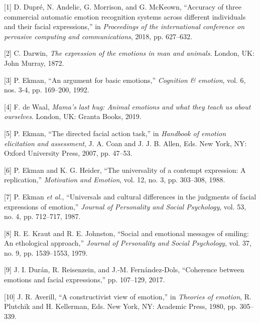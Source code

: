 \documentclass[conference,final,]{IEEEtran}
\begin{document}
\footnotesize

\hypertarget{refs}{}
\leavevmode\hypertarget{ref-dupre2018accuracy}{}%
{[}1{]} D. Dupré, N. Andelic, G. Morrison, and G. McKeown, ``Accuracy of
three commercial automatic emotion recognition systems across different
individuals and their facial expressions,'' in \emph{Proceedings of the
international conference on pervasive computing and communications},
2018, pp. 627--632.

\leavevmode\hypertarget{ref-darwin1872expression}{}%
{[}2{]} C. Darwin, \emph{The expression of the emotions in man and
animals}. London, UK: John Murray, 1872.

\leavevmode\hypertarget{ref-ekman1992argument}{}%
{[}3{]} P. Ekman, ``An argument for basic emotions,'' \emph{Cognition \&
emotion}, vol. 6, nos. 3-4, pp. 169--200, 1992.

\leavevmode\hypertarget{ref-de2019mama}{}%
{[}4{]} F. de Waal, \emph{Mama's last hug: Animal emotions and what they
teach us about ourselves}. London, UK: Granta Books, 2019.

\leavevmode\hypertarget{ref-ekman2007directed}{}%
{[}5{]} P. Ekman, ``The directed facial action task,'' in \emph{Handbook
of emotion elicitation and assessment}, J. A. Coan and J. J. B. Allen,
Eds. New York, NY: Oxford University Press, 2007, pp. 47--53.

\leavevmode\hypertarget{ref-ekman1988universality}{}%
{[}6{]} P. Ekman and K. G. Heider, ``The universality of a contempt
expression: A replication,'' \emph{Motivation and Emotion}, vol. 12, no.
3, pp. 303--308, 1988.

\leavevmode\hypertarget{ref-ekman1987universals}{}%
{[}7{]} P. Ekman \emph{et al.}, ``Universals and cultural differences in
the judgments of facial expressions of emotion,'' \emph{Journal of
Personality and Social Psychology}, vol. 53, no. 4, pp. 712--717, 1987.

\leavevmode\hypertarget{ref-kraut1979social}{}%
{[}8{]} R. E. Kraut and R. E. Johnston, ``Social and emotional messages
of smiling: An ethological approach,'' \emph{Journal of Personality and
Social Psychology}, vol. 37, no. 9, pp. 1539--1553, 1979.

\leavevmode\hypertarget{ref-duran2017coherence}{}%
{[}9{]} J. I. Durán, R. Reisenzein, and J.-M. Fernández-Dols,
``Coherence between emotions and facial expressions,'' pp. 107--129,
2017.

\leavevmode\hypertarget{ref-averill1980constructivist}{}%
{[}10{]} J. R. Averill, ``A constructivist view of emotion,'' in
\emph{Theories of emotion}, R. Plutchik and H. Kellerman, Eds. New York,
NY: Academic Press, 1980, pp. 305--339.
\end{document}
